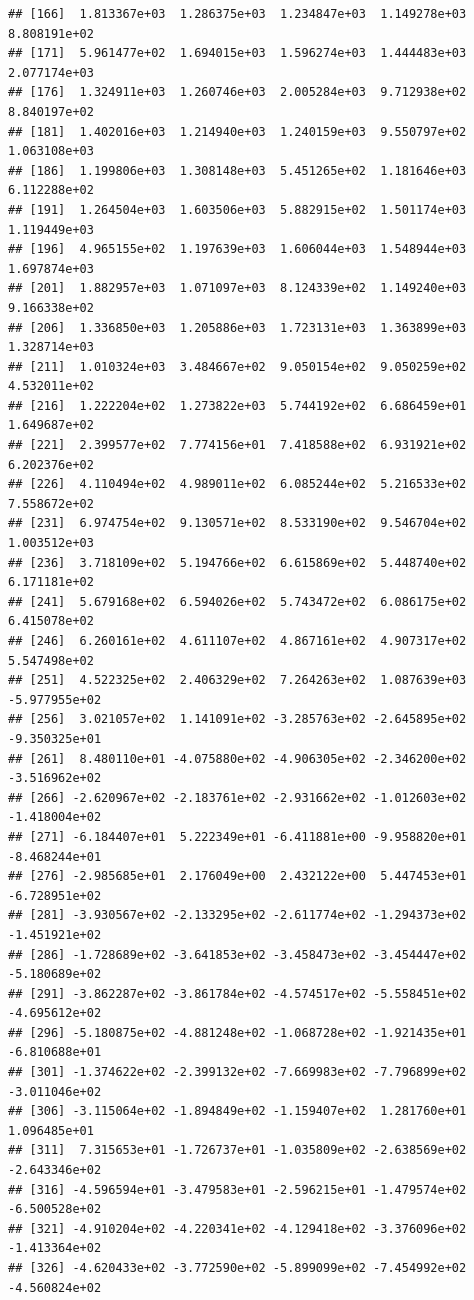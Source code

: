 \documentclass[
]{article}
\begin{document}
\begin{verbatim}
## [166]  1.813367e+03  1.286375e+03  1.234847e+03  1.149278e+03  8.808191e+02
## [171]  5.961477e+02  1.694015e+03  1.596274e+03  1.444483e+03  2.077174e+03
## [176]  1.324911e+03  1.260746e+03  2.005284e+03  9.712938e+02  8.840197e+02
## [181]  1.402016e+03  1.214940e+03  1.240159e+03  9.550797e+02  1.063108e+03
## [186]  1.199806e+03  1.308148e+03  5.451265e+02  1.181646e+03  6.112288e+02
## [191]  1.264504e+03  1.603506e+03  5.882915e+02  1.501174e+03  1.119449e+03
## [196]  4.965155e+02  1.197639e+03  1.606044e+03  1.548944e+03  1.697874e+03
## [201]  1.882957e+03  1.071097e+03  8.124339e+02  1.149240e+03  9.166338e+02
## [206]  1.336850e+03  1.205886e+03  1.723131e+03  1.363899e+03  1.328714e+03
## [211]  1.010324e+03  3.484667e+02  9.050154e+02  9.050259e+02  4.532011e+02
## [216]  1.222204e+02  1.273822e+03  5.744192e+02  6.686459e+01  1.649687e+02
## [221]  2.399577e+02  7.774156e+01  7.418588e+02  6.931921e+02  6.202376e+02
## [226]  4.110494e+02  4.989011e+02  6.085244e+02  5.216533e+02  7.558672e+02
## [231]  6.974754e+02  9.130571e+02  8.533190e+02  9.546704e+02  1.003512e+03
## [236]  3.718109e+02  5.194766e+02  6.615869e+02  5.448740e+02  6.171181e+02
## [241]  5.679168e+02  6.594026e+02  5.743472e+02  6.086175e+02  6.415078e+02
## [246]  6.260161e+02  4.611107e+02  4.867161e+02  4.907317e+02  5.547498e+02
## [251]  4.522325e+02  2.406329e+02  7.264263e+02  1.087639e+03 -5.977955e+02
## [256]  3.021057e+02  1.141091e+02 -3.285763e+02 -2.645895e+02 -9.350325e+01
## [261]  8.480110e+01 -4.075880e+02 -4.906305e+02 -2.346200e+02 -3.516962e+02
## [266] -2.620967e+02 -2.183761e+02 -2.931662e+02 -1.012603e+02 -1.418004e+02
## [271] -6.184407e+01  5.222349e+01 -6.411881e+00 -9.958820e+01 -8.468244e+01
## [276] -2.985685e+01  2.176049e+00  2.432122e+00  5.447453e+01 -6.728951e+02
## [281] -3.930567e+02 -2.133295e+02 -2.611774e+02 -1.294373e+02 -1.451921e+02
## [286] -1.728689e+02 -3.641853e+02 -3.458473e+02 -3.454447e+02 -5.180689e+02
## [291] -3.862287e+02 -3.861784e+02 -4.574517e+02 -5.558451e+02 -4.695612e+02
## [296] -5.180875e+02 -4.881248e+02 -1.068728e+02 -1.921435e+01 -6.810688e+01
## [301] -1.374622e+02 -2.399132e+02 -7.669983e+02 -7.796899e+02 -3.011046e+02
## [306] -3.115064e+02 -1.894849e+02 -1.159407e+02  1.281760e+01  1.096485e+01
## [311]  7.315653e+01 -1.726737e+01 -1.035809e+02 -2.638569e+02 -2.643346e+02
## [316] -4.596594e+01 -3.479583e+01 -2.596215e+01 -1.479574e+02 -6.500528e+02
## [321] -4.910204e+02 -4.220341e+02 -4.129418e+02 -3.376096e+02 -1.413364e+02
## [326] -4.620433e+02 -3.772590e+02 -5.899099e+02 -7.454992e+02 -4.560824e+02

\end{verbatim}
\end{document}

